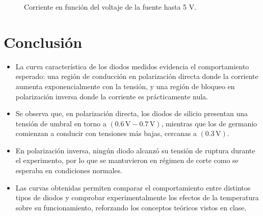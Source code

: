 \vspace{1cm}

\begin{figure}[H]
\centering
{}
\caption{Corriente en función del voltaje de la fuente hasta 5 V.}
\label{fig:IV_5V}
\end{figure}

\section{Conclusión}

\begin{itemize}
  \item La curva característica de los diodos medidos evidencia el comportamiento esperado: una región de conducción en polarización directa donde la corriente aumenta exponencialmente con la tensión, y una región de bloqueo en polarización inversa donde la corriente es prácticamente nula.

  \item Se observa que, en polarización directa, los diodos de silicio presentan una tensión de umbral en torno a $(0.6\,\text{V} - 0.7\,\text{V})$, mientras que los de germanio comienzan a conducir con tensiones más bajas, cercanas a $(0.3\,\text{V})$.

  \item En polarización inversa, ningún diodo alcanzó su tensión de ruptura durante el experimento, por lo que se mantuvieron en régimen de corte como se esperaba en condiciones normales.

  \item Las curvas obtenidas permiten comparar el comportamiento entre distintos tipos de diodos y comprobar experimentalmente los efectos de la temperatura sobre su funcionamiento, reforzando los conceptos teóricos vistos en clase.
\end{itemize}
